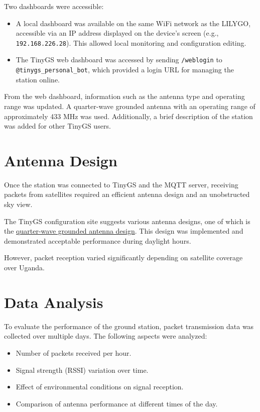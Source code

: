 \documentclass{article}
\begin{document}
Two dashboards were accessible:
\begin{itemize}
    \item A local dashboard was available on the same WiFi network as the LILYGO, accessible via an IP address displayed on the device's screen (e.g., \texttt{192.168.226.28}). This allowed local monitoring and configuration editing.
    \item The TinyGS web dashboard was accessed by sending \texttt{/weblogin} to \texttt{@tinygs\_personal\_bot}, which provided a login URL for managing the station online.
\end{itemize}

From the web dashboard, information such as the antenna type and operating range was updated. A quarter-wave grounded antenna with an operating range of approximately 433 MHz was used. Additionally, a brief description of the station was added for other TinyGS users.

\section{Antenna Design}
Once the station was connected to TinyGS and the MQTT server, receiving packets from satellites required an efficient antenna design and an unobstructed sky view.

The TinyGS configuration site suggests various antenna designs, one of which is the \href{http://www.n1gy.com/simple-ground-plane-antennas.html}{quarter-wave grounded antenna design}. This design was implemented and demonstrated acceptable performance during daylight hours.

However, packet reception varied significantly depending on satellite coverage over Uganda.

\section{Data Analysis}
To evaluate the performance of the ground station, packet transmission data was collected over multiple days. The following aspects were analyzed:
\begin{itemize}
    \item Number of packets received per hour.
    \item Signal strength (RSSI) variation over time.
    \item Effect of environmental conditions on signal reception.
    \item Comparison of antenna performance at different times of the day.
\end{itemize}
\end{document}
